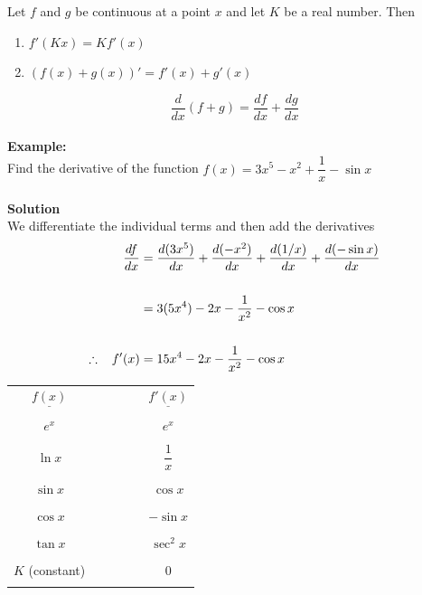 \documentclass[11pt,a4paper]{article}
\begin{document}
\pagebreak
Let $f$ and $g$ be  continuous at a point $x$ and let $K$ be a real number. Then
\begin{enumerate}
\item[(a).] $f'(Kx)=K f'(x)$
\item[(b).] $(f(x)+g(x))'=f'(x) + g'(x)$
\end{enumerate}
$$\dfrac{d}{dx}(f+g) = \dfrac{df}{dx}+\dfrac{dg}{dx}$$\\


\textbf{Example:}\\
Find the derivative of the function $f(x)=3x^5-x^2+\dfrac{1}{x}-\sin x$\\\\

\textbf{Solution}\\
We differentiate the individual terms and then add the derivatives
\begin{align*}
\frac{df}{dx} & = \frac{d(3x^5)}{dx}+\frac{d(-x^2)}{dx}+\frac{d(1/x)}{dx}+\frac{d(-\sin x)}{dx}\\\\
& = 3 (5x^4)-2x-\dfrac{1}{x^2}-\cos x\\\\
\therefore \hspace{0.3cm} f'(x) & = 15x^4-2x-\frac{1}{x^2}-\cos x\\
\end{align*}



\begin{table}[H]
\centering
\begin{tabular}{cccccc}
$\underline{f(x)}$ &&&&& $\underline{f'(x)}$\\\\
$e^x$ &&&&& $e^x$\\\\
$\ln x$ &&&&& $\dfrac{1}{x}$\\\\
$\sin x$ &&&&& $\cos x$\\\\
$\cos x$ &&&&& $-\sin x$\\\\
$\tan x$ &&&&& $\sec^2x$\\\\
$K$ (constant) &&&&& 0\\\\
\end{tabular}
\end{table}
\end{document}
